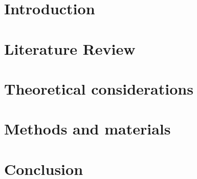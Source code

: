 \documentclass[english,12pt,a4paper]{report}
\begin{document}
	
		
		
	
	
	
	
	
	
\chapter{Introduction}
	
\chapter{Literature Review}
	
\chapter{Theoretical considerations}
	
\chapter{Methods and materials}
	
\chapter{Conclusion}
		
	\printbibliography[title={References}]		
\end{document}
